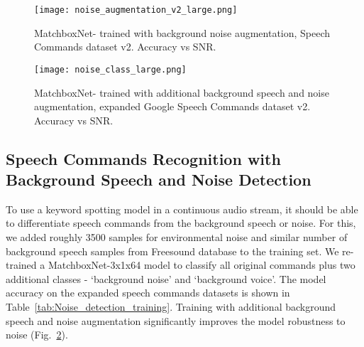 \documentclass[a4paper]{article}
\begin{document}
\begin{figure}[ht!]
  \centering
  \texttt{[image: noise\_augmentation\_v2\_large.png]}
  \caption{MatchboxNet- trained with background noise augmentation, Speech Commands dataset v2. Accuracy vs SNR.}
  \label{fig:noise_augmentation_eval_v2}
\end{figure}

\begin{figure}[ht!]
  \centering
  \texttt{[image: noise\_class\_large.png]}
  \caption{MatchboxNet- trained with additional background speech and noise augmentation, expanded Google Speech Commands dataset v2. Accuracy vs SNR.}
  \label{fig:noise_detection_eval}
\end{figure}

\subsection{Speech Commands Recognition with Background Speech and Noise Detection}

To use a keyword spotting model in a continuous audio stream, it should be able to differentiate speech commands from the background speech or noise. For this,  we added roughly 3500 samples for environmental noise  and similar number of  background speech samples from Freesound database to the training set. We re-trained a MatchboxNet-3x1x64 model to classify all  original commands plus two additional classes - `background noise' and `background voice'. The model accuracy on the expanded speech commands datasets is shown in Table~\ref{tab:Noise_detection_training}. Training with additional background speech and noise augmentation significantly improves the model robustness to noise (Fig.~\ref{fig:noise_detection_eval}).

{\renewcommand{\arraystretch}{1.1}
\begin{table}[ht!]
\caption{MatchboxNet- trained with additional background speech and noise augmentation, expanded Speech Commands dataset. Accuracy (\%) is averaged over 5 trials (95\% confidence interval). }
\label{tab:Noise_detection_training}
\centering
{}
\end{table}
}
\end{document}
